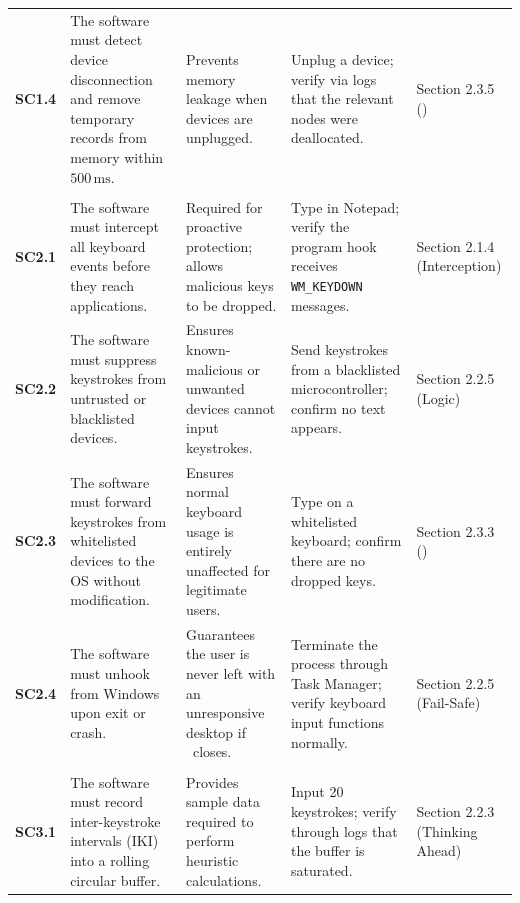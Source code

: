 {\begin{xltabular}{\textwidth}{@{} l P{3.0cm} L L P{2.2cm} @{}}
			\textbf{SC1.4} &
			The software must detect device disconnection and remove temporary records from memory within $500\,\text{ms}$. &
			Prevents memory leakage when devices are unplugged. &
			Unplug a device; verify via logs that the relevant nodes were deallocated. &
			Section 2.3.5 (\stakeholdersTU) \\
			\addlinespace[0.8em]

			 \\
			\midrule

			\textbf{SC2.1} &
			The software must intercept all keyboard events before they reach applications. &
			Required for proactive protection; allows malicious keys to be dropped. &
			Type in Notepad; verify the program hook receives \texttt{WM\_KEYDOWN} messages. &
			Section 2.1.4 (Interception) \\

			\textbf{SC2.2} &
			The software must suppress keystrokes from untrusted or blacklisted devices. &
			Ensures known-malicious or unwanted devices cannot input keystrokes. &
			Send keystrokes from a blacklisted microcontroller; confirm no text appears. &
			Section 2.2.5 (Logic) \\

			\textbf{SC2.3} &
			The software must forward keystrokes from whitelisted devices to the OS without modification. &
			Ensures normal keyboard usage is entirely unaffected for legitimate users. &
			Type on a whitelisted keyboard; confirm there are no dropped keys. &
			Section 2.3.3 (\stakeholdersPU) \\

			\textbf{SC2.4} &
			The software must unhook from Windows upon exit or crash. &
			Guarantees the user is never left with an unresponsive desktop if \projectNameFormatted\ closes. &
			Terminate the process through Task Manager; verify keyboard input functions normally. &
			Section 2.2.5 (Fail-Safe) \\
			\addlinespace[0.8em]

			 \\
			\midrule

			\textbf{SC3.1} &
			The software must record inter-keystroke intervals ($\text{IKI}$) into a rolling circular buffer. &
			Provides sample data required to perform heuristic calculations. &
			Input 20 keystrokes; verify through logs that the buffer is saturated. &
			Section 2.2.3 (Thinking Ahead) \\


\end{xltabular}}
